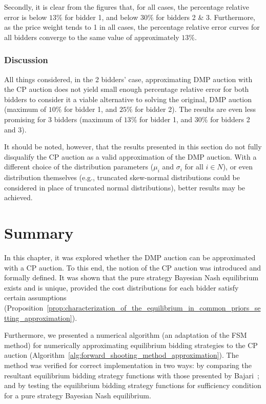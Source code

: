 Secondly, it is clear from the figures that, for all cases, the percentage relative error is below $13\%$ for bidder 1, and below $30\%$ for bidders 2 \& 3. Furthermore, as the price weight tends to 1 in all cases, the percentage relative error curves for all bidders converge to the same value of approximately $13\%$.

\subsubsection{Discussion} %
\label{ssub:discussion_approximation}
All things considered, in the 2 bidders' case, approximating DMP auction with the CP auction does not yield small enough percentage relative error for both bidders to consider it a viable alternative to solving the original, DMP auction (maximum of $10\%$ for bidder 1, and $25\%$ for bidder 2). The results are even less promising for 3 bidders (maximum of $13\%$ for bidder 1, and $30\%$ for bidders 2 and 3).

It should be noted, however, that the results presented in this section do not fully disqualify the CP auction as a valid approximation of the DMP auction. With a different choice of the distribution parameters ($\mu_i$ and $\sigma_i$ for all $i\in N$), or even distribution themselves (e.g., truncated skew-normal distributions could be considered in place of truncated normal distributions), better results may be achieved.

\section{Summary} %
\label{sec:summary_approximation}
In this chapter, it was explored whether the DMP auction can be approximated with a CP auction. To this end, the notion of the CP auction was introduced and formally defined. It was shown that the pure strategy Bayesian Nash equilibrium exists and is unique, provided the cost distributions for each bidder satisfy certain assumptions (Proposition~\ref{prop:characterization_of_the_equilibrium_in_common_priors_setting_approximation}).

Furthermore, we presented a numerical algorithm (an adaptation of the FSM method) for numerically approximating equilibrium bidding strategies to the CP auction (Algorithm~\ref{alg:forward_shooting_method_approximation}). The method was verified for correct implementation in two ways: by comparing the resultant equilibrium bidding strategy functions with those presented by Bajari~\cite{Bajari2001a}; and by testing the equilibrium bidding strategy functions for sufficiency condition for a pure strategy Bayesian Nash equilibrium.

